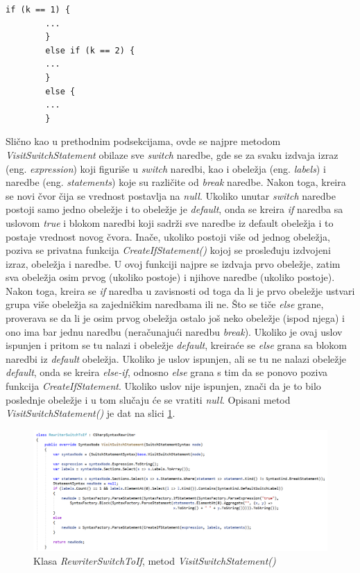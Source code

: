 \documentclass[a4paper]{article}
\begin{document}
{\begin{lstlisting}[caption={\textit{If-else} naredba}, label=lst:ifelse]
		if (k == 1) {
		...
		}
		else if (k == 2) {
		...
		}
		else {
		...
		}
		\end{lstlisting}
		
		
		Slično kao u prethodnim podsekcijama, ovde se najpre metodom \textit{VisitSwitchStatement} obilaze sve \textit{switch} naredbe, gde se za svaku izdvaja izraz (eng. \textit{expression}) koji figuriše u \textit{switch} naredbi, kao i obeležja (eng. \textit{labels}) i naredbe (eng. \textit{statements}) koje su različite od \textit{break} naredbe. Nakon toga, kreira se novi čvor čija se vrednost postavlja na \textit{null}. Ukoliko unutar \textit{switch} naredbe postoji samo jedno obeležje i to obeležje je \textit{default}, onda se kreira \textit{if} naredba sa uslovom \textit{true} i blokom naredbi koji sadrži sve naredbe iz default obeležja i to postaje vrednost novog čvora.
		Inače, ukoliko postoji više od jednog obeležja, poziva se privatna funkcija \textit{CreateIfStatement()} kojoj se prosleđuju izdvojeni izraz, obeležja i naredbe. U ovoj funkciji najpre se izdvaja prvo obeležje, zatim sva obeležja osim prvog (ukoliko postoje) i njihove naredbe (ukoliko postoje). Nakon toga, kreira se \textit{if} naredba u zavisnosti od toga da li je prvo obeležje ustvari grupa više obeležja sa zajedničkim naredbama ili ne. Što se tiče \textit{else} grane, proverava se da li je osim prvog obeležja ostalo još neko obeležje (ispod njega) i ono ima bar jednu naredbu (neračunajući naredbu \textit{break}). Ukoliko je ovaj uslov ispunjen i pritom se tu nalazi i obeležje \textit{default}, kreiraće se \textit{else} grana sa blokom naredbi iz \textit{default} obeležja. Ukoliko je uslov ispunjen, ali se tu ne nalazi obeležje \textit{default}, onda se kreira \textit{else-if}, odnosno \textit{else} grana s tim da se ponovo poziva funkcija \textit{CreateIfStatement}. Ukoliko uslov nije ispunjen, znači da je to bilo poslednje obeležje i u tom slučaju će se vratiti \textit{null}. Opisani metod \textit{VisitSwitchStatement()} je dat na slici \ref{fig:RewriterSwitchToIf_part1}.
		
		
		\begin{figure}[!htb]
			\begin{center}
				\includegraphics[scale=0.44]{images/RewriterSwitchToIf_part1.png}
			\end{center}
			\caption{Klasa \textit{RewriterSwitchToIf}, metod \textit{VisitSwitchStatement()}}
			\label{fig:RewriterSwitchToIf_part1}
		\end{figure}
		
}
\end{document}
